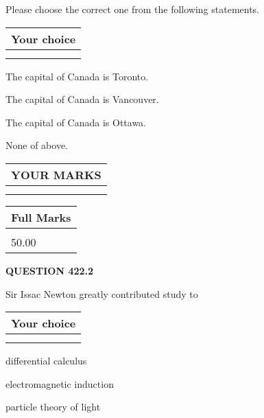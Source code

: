 \documentclass[12pt]{article}
\begin{document}
  
Please choose the correct one from the following statements.
  
  
\noindent\hspace{3.0in} \begin{tabular}{|l|}
\hline
Your choice \\
\hline
 \\ 
 \\ 
\hline
\end{tabular}
  
  
 
 
The capital of Canada is Toronto.
 
 
The capital of Canada is Vancouver.
 
 
The capital of Canada is Ottawa.
 
 
 None of above.
 
 
  
\vspace{0.2in}
  
\noindent\begin{tabular}{|l|}
\hline
 YOUR MARKS  \\
\hline
 \\ 
 \\ 
\hline
\end{tabular}
\hspace{0.05in} \begin{tabular}{|l|}
\hline
 Full Marks  \\
\hline
 \\ 
50.00 \\
\hline
\end{tabular}
{\textbf{\Large{QUESTION
422.2 
}}}
  
  
Sir Issac Newton greatly contributed study to
  
  
\noindent\hspace{3.0in} \begin{tabular}{|l|}
\hline
Your choice \\
\hline
 \\ 
 \\ 
\hline
\end{tabular}
  
  
 
 
differential calculus
 
 
electromagnetic induction
 
 
particle theory of light
 
\end{document}
